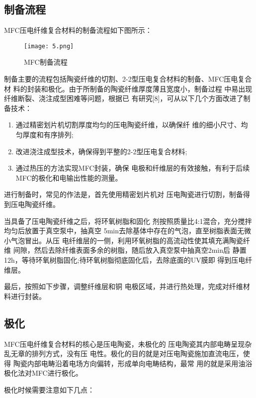\documentclass[lang=cn,11pt,a4paper,cite=authoryear]{elegantpaper}
\begin{document}
\subsection{制备流程}
MFC压电纤维复合材料的制备流程如下图所示：
\begin{figure}[htbp]
  \centering
  \texttt{[image: 5.png]}
  \caption{MFC制备流程}
\end{figure}

制备主要的流程包括陶瓷纤维的切割、2-2型压电复合材料的制备、MFC压电复合材
料的封装和极化。由于所制备的陶瓷纤维厚度薄且宽度小，制备过程
中易出现纤维断裂、浇注成型困难等问题，根据已
有研究[8]，可从以下几个方面改进了制备技术：

\begin{enumerate}
  \item 通过精密划片机切割厚度均匀的压电陶瓷纤维，以确保纤
  维的细小尺寸、均匀厚度和有序排列;
  \item 改进浇注成型技术，确保得到平整的2-2型压电复合材料;
  \item 通过热压的方法实现MFC封装，确保
  电极和纤维层的有效接触，有利于后续MFC的极化和电输出性能的测量。
\end{enumerate}

进行制备时，常见的作法是，首先使用精密划片机对
压电陶瓷进行切割，制备得到压电陶瓷纤维。

当具备了压电陶瓷纤维之后，将环氧树脂和固化
剂按照质量比4:1混合，充分搅拌均匀后放置于真空泵中，抽真空
5min去除基体中存在的气泡，直至树脂表面无微小气泡冒出。从压
电纤维层的一侧，利用环氧树脂的高流动性使其填充满陶瓷纤维
间隙，然后去除纤维表面多余的树脂，随后放入真空泵中抽真空2min后
静置12h，等待环氧树脂固化;待环氧树脂彻底固化后，去除底面的UV膜即
得到压电纤维层。

最后，按照如下步骤，调整纤维层和铜
电极区域，并进行热处理，完成对纤维材料进行封装。


\subsection{极化}

MFC压电纤维复合材料的核心是压电陶瓷，未极化的
压电陶瓷其内部电畴呈现杂乱无章的排列方式，没有压
电性。极化的目的就是对压电陶瓷施加直流电压，使得
陶瓷内部电畴沿着电场方向偏转，形成单向电畴结构，最常
用的就是采用油浴极化法对MFC进行极化。

极化时候需要注意如下几点：
\end{document}

